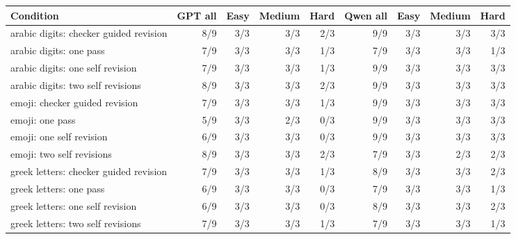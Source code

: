 \begin{tabular}{p{4.4cm}rrrrrrrr}
\toprule
Condition & GPT all & Easy & Medium & Hard & Qwen all & Easy & Medium & Hard\\
\midrule
arabic digits: checker guided revision & 8/9 & 3/3 & 3/3 & 2/3 & 9/9 & 3/3 & 3/3 & 3/3\\
arabic digits: one pass & 7/9 & 3/3 & 3/3 & 1/3 & 7/9 & 3/3 & 3/3 & 1/3\\
arabic digits: one self revision & 7/9 & 3/3 & 3/3 & 1/3 & 9/9 & 3/3 & 3/3 & 3/3\\
arabic digits: two self revisions & 8/9 & 3/3 & 3/3 & 2/3 & 9/9 & 3/3 & 3/3 & 3/3\\
emoji: checker guided revision & 7/9 & 3/3 & 3/3 & 1/3 & 9/9 & 3/3 & 3/3 & 3/3\\
emoji: one pass & 5/9 & 3/3 & 2/3 & 0/3 & 9/9 & 3/3 & 3/3 & 3/3\\
emoji: one self revision & 6/9 & 3/3 & 3/3 & 0/3 & 9/9 & 3/3 & 3/3 & 3/3\\
emoji: two self revisions & 8/9 & 3/3 & 3/3 & 2/3 & 7/9 & 3/3 & 2/3 & 2/3\\
greek letters: checker guided revision & 7/9 & 3/3 & 3/3 & 1/3 & 8/9 & 3/3 & 3/3 & 2/3\\
greek letters: one pass & 6/9 & 3/3 & 3/3 & 0/3 & 7/9 & 3/3 & 3/3 & 1/3\\
greek letters: one self revision & 6/9 & 3/3 & 3/3 & 0/3 & 8/9 & 3/3 & 3/3 & 2/3\\
greek letters: two self revisions & 7/9 & 3/3 & 3/3 & 1/3 & 7/9 & 3/3 & 3/3 & 1/3\\
\bottomrule
\end{tabular}
